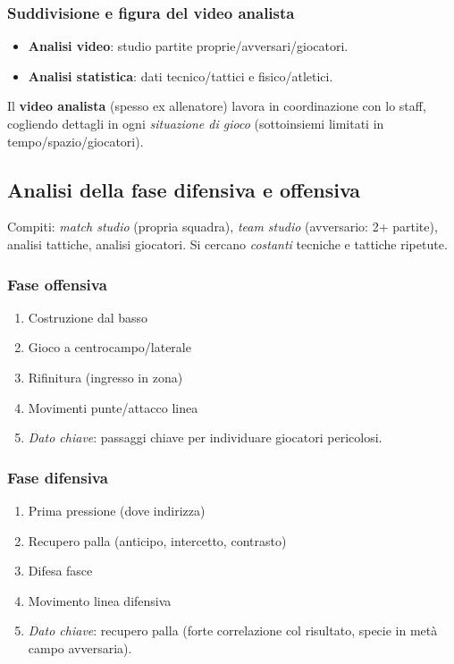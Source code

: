 \documentclass[a4paper,11pt]{article}
\begin{document}
\subsubsection{Suddivisione e figura del video analista}
\begin{itemize}
    \item \textbf{Analisi video}: studio partite proprie/avversari/giocatori.
    \item \textbf{Analisi statistica}: dati tecnico/tattici e fisico/atletici.
\end{itemize}
Il \textbf{video analista} (spesso ex allenatore) lavora in coordinazione con lo staff, cogliendo dettagli in ogni \textit{situazione di gioco} (sottoinsiemi limitati in tempo/spazio/giocatori).

\subsection{Analisi della fase difensiva e offensiva}
Compiti: \textit{match studio} (propria squadra), \textit{team studio} (avversario: 2+ partite), analisi tattiche, analisi giocatori. Si cercano \textit{costanti} tecniche e tattiche ripetute.

\subsubsection{Fase offensiva}
\begin{enumerate}
    \item Costruzione dal basso
    \item Gioco a centrocampo/laterale
    \item Rifinitura (ingresso in zona)
    \item Movimenti punte/attacco linea
    \item \textit{Dato chiave}: passaggi chiave per individuare giocatori pericolosi.
\end{enumerate}

\subsubsection{Fase difensiva}
\begin{enumerate}
    \item Prima pressione (dove indirizza)
    \item Recupero palla (anticipo, intercetto, contrasto)
    \item Difesa fasce
    \item Movimento linea difensiva
    \item \textit{Dato chiave}: recupero palla (forte correlazione col risultato, specie in metà campo avversaria).
\end{enumerate}
\end{document}
